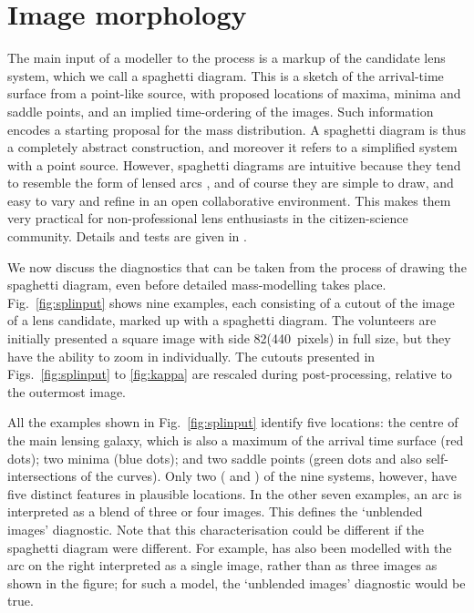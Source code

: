 
\section{Image morphology}
\label{sec:morph}

The main input of a modeller to the process is a markup of the
candidate lens system, which we call a spaghetti diagram.  This is a
sketch of the arrival-time surface from a point-like source, with
proposed locations of maxima, minima and saddle points, and an implied
time-ordering of the images.  Such information encodes a starting
proposal for the mass distribution.  A spaghetti diagram is thus a
completely abstract construction, and moreover it refers to a
simplified system with a point source.  However, spaghetti diagrams
are intuitive because they tend to resemble the form of lensed arcs
\citep[see Fig.3 of][]{2008MNRAS.383..857F}, and of course they are
simple to draw, and easy to vary and refine in an open collaborative
environment. This makes them very practical for non-professional lens
enthusiasts in the citizen-science community.  Details and tests are
given in \citet{2015MNRAS.447.2170K}.

We now discuss the diagnostics that can be taken from the process of
drawing the spaghetti diagram, even before detailed mass-modelling
takes place.  Fig.~\ref{fig:splinput} shows nine examples, each
consisting of a cutout of the \SW  image of a lens candidate,
marked up with a spaghetti diagram.
The volunteers are initially presented a square image with side
82\arcsec (440~pixels) in full size, but they have the
ability to zoom in individually.
The cutouts presented in Figs.~\ref{fig:splinput} to \ref{fig:kappa}
are rescaled during post-processing, relative to the outermost image.

All the examples shown in Fig.~\ref{fig:splinput} identify five locations:
the centre of the main lensing galaxy, which is also a maximum of the
arrival time surface (red dots); two minima (blue dots); and two
saddle points (green dots and also self-intersections of the curves).
Only two ( and ) of the nine systems, however, have five
distinct features in plausible locations.  In the other seven
examples, an arc is interpreted as a blend of three or four images.
This defines the `unblended images' diagnostic.  Note that this
characterisation could be different if the spaghetti diagram were 
different.  For example,  has also been modelled with the arc on
the right interpreted as a single image, rather than as three images
as shown in the figure; for such a model, the `unblended images'
diagnostic would be true.

